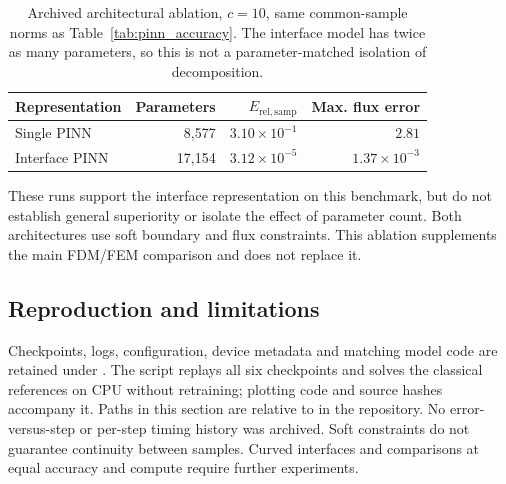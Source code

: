 \begin{table}[H]\centering\small
\caption{Archived architectural ablation, $c=10$, same common-sample norms
as Table~\ref{tab:pinn_accuracy}. The interface model has twice as many
parameters, so this is not a parameter-matched isolation of decomposition.}
\label{tab:pinn_ablation}
\begin{tabular}{@{}lrrr@{}}\toprule
Representation & Parameters & $E_{\mathrm{rel,samp}}$ & Max. flux error\\\midrule
Single PINN & 8,577 & $3.10\times10^{-1}$ & $2.81$\\
Interface PINN & 17,154 & $3.12\times10^{-5}$ & $1.37\times10^{-3}$\\\bottomrule
\end{tabular}
\end{table}

These runs support the interface representation on this benchmark, but do
not establish general superiority or isolate the effect of parameter count.
Both architectures use soft boundary and flux constraints. This ablation
supplements the main FDM/FEM comparison and does not replace it.

\subsection{Reproduction and limitations}
Checkpoints, logs, configuration, device metadata and matching model code
are retained under .
The script  replays all six
checkpoints and solves the classical references on CPU without retraining;
plotting code and source hashes accompany it. Paths in this section are
relative to  in the repository. No error-versus-step or
per-step timing history was archived. Soft constraints do not guarantee
continuity between samples. Curved interfaces and comparisons at equal
accuracy and compute require further experiments.
